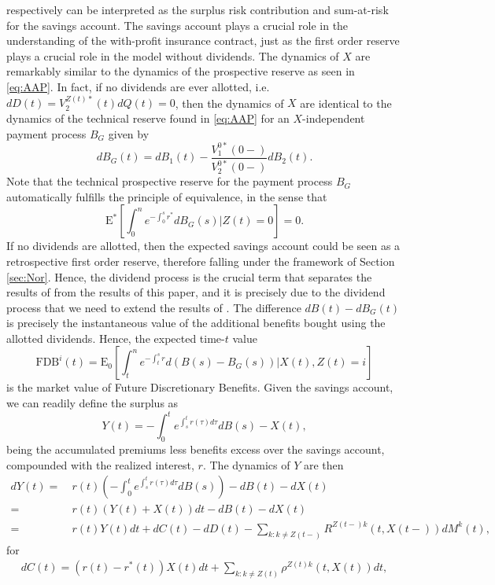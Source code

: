 \documentclass[12pt]{article}
\newcommand{\E}{\text{E}}
\theoremstyle{my_thm}
\theoremstyle{my_rem}
\newenvironment{remark}
  {\pushQED{\qed}\renewcommand{\qedsymbol}{$\triangle$}\remarkex}
  {\popQED\endremarkex}
\begin{document}
respectively can be interpreted as the surplus risk contribution and sum-at-risk for the savings account. The savings account plays a crucial role in the understanding of the with-profit insurance contract, just as the first order reserve plays a crucial role in the model without dividends. The dynamics of $X$ are remarkably similar to the dynamics of the prospective reserve as seen in \eqref{eq:AAP}. In fact, if no dividends are ever allotted, i.e. $dD(t)=V_2^{Z(t)*}(t)dQ(t)=0$, then the dynamics of $X$ are identical to the dynamics of the technical reserve found in \eqref{eq:AAP} for an $X$-independent payment process $B_G$ given  by
$$
dB_G(t)=dB_1(t)-\frac{V_1^{0*}(0-)}{V_2^{0*}(0-)}dB_2(t).
$$
Note that the technical prospective reserve for the payment process $B_G$ automatically fulfills the principle of equivalence, in the sense that
$$
\E^* \left[ \int_0^n e^{-\int_0^s r^*} dB_G(s)  |Z(t)=0\right]=0.
$$
If no dividends are allotted, then the expected savings account could be seen as a retrospective first order reserve, therefore falling under the framework of Section \ref{sec:Nor}. Hence, the dividend process is the crucial term that separates the results of \citet{Norberg} from the results of this paper, and it is precisely due to the dividend process that we need to extend the results of \citet{Norberg}.
\begin{remark}[Future Discretionary Benefits]\label{remark_FDB}
The difference $dB(t)-dB_G(t)$ is precisely the instantaneous value of the additional benefits bought using the allotted dividends. Hence, the expected time-$t$ value
$$
\text{FDB}^i(t)=\E_0 \left[  \int_t^n e^{-\int_t^s r} d(B(s)-B_G(s)) |X(t), Z(t)=i \right]
$$
is the market value of Future Discretionary Benefits. 
\end{remark}
\noindent
Given the savings account, we can readily define the surplus as
$$
Y(t)= - \int_0^t e^{\int_s^t r(\tau) d\tau} dB(s)-X(t),
$$
being the accumulated premiums less benefits excess over the savings account, compounded with the realized interest, $r$. The dynamics of $Y$ are then
\begin{align}
dY(t)= \ &
 r(t) \left( -\int_0^t e^{\int_s^t r(\tau) d\tau} dB(s) \right) - dB(t) -dX(t) \nonumber
\\
= \ &
r(t) \left(Y(t) + X(t) \right)dt - dB(t) -dX(t) \nonumber \\
= \ & r(t) Y(t) dt + dC(t)-dD(t)-
\sum_{k:k \neq Z(t-)}  R^{Z(t-)k}(t,X(t-)) dM^k(t), \label{eq:AAC}
\end{align}
for 
\begin{gather*}
dC(t)=(r(t)-r^*(t))X(t)dt+\sum_{k:k\neq Z(t)} \rho^{Z(t)k}(t,X(t)) dt,
\end{gather*}
\end{document}

